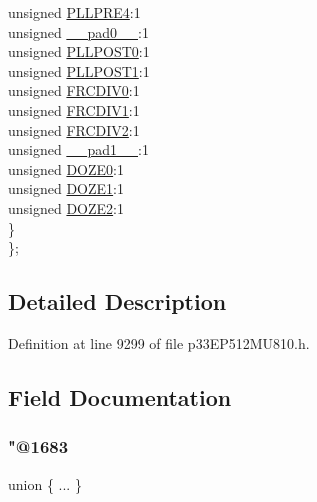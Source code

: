\begin{DoxyCompactItemize}
\begin{tabbing}
\>\>unsigned \hyperlink{structtag_c_l_k_d_i_v_b_i_t_s_a70f066b5e9b78deee7bfaa70c06b4663}{PLLPRE4}:1\\
\>\>unsigned \hyperlink{structtag_c_l_k_d_i_v_b_i_t_s_adf71f3d8410c1f1dbbc96680a92c49af}{\_\_pad0\_\_}:1\\
\>\>unsigned \hyperlink{structtag_c_l_k_d_i_v_b_i_t_s_a0b3113de0a7cddbd82c2bcc5d44e71af}{PLLPOST0}:1\\
\>\>unsigned \hyperlink{structtag_c_l_k_d_i_v_b_i_t_s_a4b8a769ec9fd3c0f591bb315079a4dd4}{PLLPOST1}:1\\
\>\>unsigned \hyperlink{structtag_c_l_k_d_i_v_b_i_t_s_aa272b16840612060bdb4e66d0c054157}{FRCDIV0}:1\\
\>\>unsigned \hyperlink{structtag_c_l_k_d_i_v_b_i_t_s_ac43f0f65eef382933e6fb63d8c05c2d0}{FRCDIV1}:1\\
\>\>unsigned \hyperlink{structtag_c_l_k_d_i_v_b_i_t_s_aacc792911f99e152ce05278544bb4582}{FRCDIV2}:1\\
\>\>unsigned \hyperlink{structtag_c_l_k_d_i_v_b_i_t_s_acaf2d0924a107ec6e8d2e31febaf66f9}{\_\_pad1\_\_}:1\\
\>\>unsigned \hyperlink{structtag_c_l_k_d_i_v_b_i_t_s_ab5f89f0b141d16f8bfcff766d26284e5}{DOZE0}:1\\
\>\>unsigned \hyperlink{structtag_c_l_k_d_i_v_b_i_t_s_a66280c9b18d0cc5d8698764242ffab9f}{DOZE1}:1\\
\>\>unsigned \hyperlink{structtag_c_l_k_d_i_v_b_i_t_s_a702f0410a331fcdb918562ef47b3134f}{DOZE2}:1\\
\>\} \\
\}; \\

\end{tabbing}\end{DoxyCompactItemize}


\subsection{Detailed Description}


Definition at line 9299 of file p33\+E\+P512\+M\+U810.\+h.



\subsection{Field Documentation}
\mbox{\label{structtag_c_l_k_d_i_v_b_i_t_s_ab4793a40001dfb5004ae1b3632cf9f21}} 
\subsubsection{\texorpdfstring{"@1683}{@1683}}
{\footnotesize\ttfamily union \{ ... \} }

